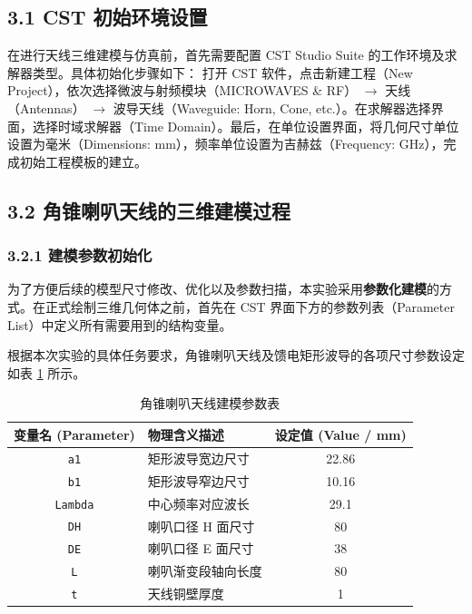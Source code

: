 \documentclass{ctexart}
\newcounter{makepart}
\begin{document}

\subsection*{3.1 CST 初始环境设置}
在进行天线三维建模与仿真前，首先需要配置 CST Studio Suite 的工作环境及求解器类型。具体初始化步骤如下：
打开 CST 软件，点击新建工程（New Project），依次选择微波与射频模块（MICROWAVES \& RF） $\rightarrow$ 天线（Antennas） $\rightarrow$ 波导天线（Waveguide: Horn, Cone, etc.）。在求解器选择界面，选择时域求解器（Time Domain）。最后，在单位设置界面，将几何尺寸单位设置为毫米（Dimensions: mm），频率单位设置为吉赫兹（Frequency: GHz），完成初始工程模板的建立。

\subsection*{3.2 角锥喇叭天线的三维建模过程}

\subsubsection*{3.2.1 建模参数初始化}
为了方便后续的模型尺寸修改、优化以及参数扫描，本实验采用\textbf{参数化建模}的方式。在正式绘制三维几何体之前，首先在 CST 界面下方的参数列表（Parameter List）中定义所有需要用到的结构变量。

根据本次实验的具体任务要求，角锥喇叭天线及馈电矩形波导的各项尺寸参数设定如表 \ref{tab:parameters} 所示。

\begin{table}[htbp]
    \centering
    \caption{角锥喇叭天线建模参数表}
    \vspace{5pt}
    \begin{tabular}{clc}
        \hline
        \textbf{变量名 (Parameter)} & \textbf{物理含义描述} & \textbf{设定值 (Value / mm)} \\
        \hline
        \texttt{a1} & 矩形波导宽边尺寸 & 22.86 \\
        \texttt{b1} & 矩形波导窄边尺寸 & 10.16 \\
        \texttt{Lambda} & 中心频率对应波长 & 29.1 \\
        \texttt{DH} & 喇叭口径 H 面尺寸 & 80 \\
        \texttt{DE} & 喇叭口径 E 面尺寸 & 38 \\
        \texttt{L}  & 喇叭渐变段轴向长度 & 80 \\
        \texttt{t}  & 天线铜壁厚度 & 1 \\
        \hline
    \end{tabular}
    \label{tab:parameters}
\end{table}
\end{document}
